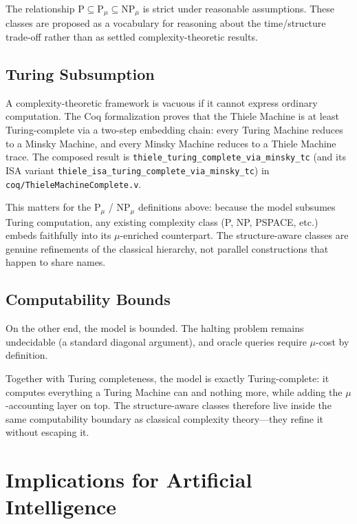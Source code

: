 The relationship $\text{P} \subseteq \text{P}_\mu \subseteq \text{NP}_\mu$ is strict under reasonable assumptions. These classes are proposed as a vocabulary for reasoning about the time/structure trade-off rather than as settled complexity-theoretic results.

\subsection{Turing Subsumption}

A complexity-theoretic framework is vacuous if it cannot express ordinary computation. The Coq formalization proves that the Thiele Machine is at least Turing-complete via a two-step embedding chain: every Turing Machine reduces to a Minsky Machine, and every Minsky Machine reduces to a Thiele Machine trace. The composed result is \texttt{thiele\_turing\_complete\_via\_minsky\_tc} (and its ISA variant \texttt{thiele\_isa\_turing\_complete\_via\_minsky\_tc}) in \texttt{coq/ThieleMachineComplete.v}.

This matters for the $\text{P}_\mu$ / $\text{NP}_\mu$ definitions above: because the model subsumes Turing computation, any existing complexity class (P, NP, PSPACE, etc.) embeds faithfully into its $\mu$-enriched counterpart. The structure-aware classes are genuine refinements of the classical hierarchy, not parallel constructions that happen to share names.

\subsection{Computability Bounds}

On the other end, the model is bounded. The halting problem remains undecidable (a standard diagonal argument), and oracle queries require $\mu$-cost by definition.

Together with Turing completeness, the model is exactly Turing-complete: it computes everything a Turing Machine can and nothing more, while adding the $\mu$-accounting layer on top. The structure-aware classes therefore live inside the same computability boundary as classical complexity theory---they refine it without escaping it.

\section{Implications for Artificial Intelligence}

